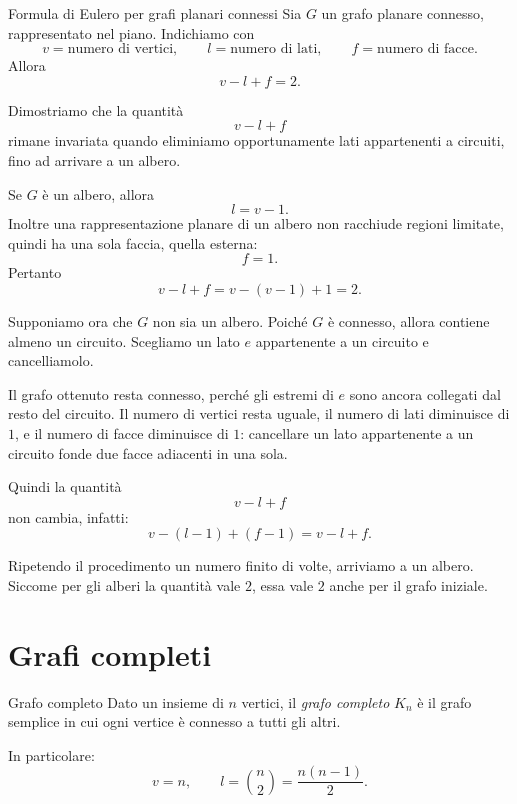 \documentclass[a4paper]{article}
\begin{document}
\begin{snippettheorem}{Formula di Eulero per grafi planari connessi}
    Sia \(G\) un grafo planare connesso, rappresentato nel piano. Indichiamo con
    \[
        v=\text{numero di vertici},
        \qquad
        l=\text{numero di lati},
        \qquad
        f=\text{numero di facce}.
    \]
    Allora
    \[
        v-l+f=2.
    \]
\end{snippettheorem}

\begin{snippetproof}{}
    Dimostriamo che la quantità
    \[
        v-l+f
    \]
    rimane invariata quando eliminiamo opportunamente lati appartenenti a circuiti, fino ad arrivare a un albero.

    Se \(G\) è un albero, allora
    \[
        l=v-1.
    \]
    Inoltre una rappresentazione planare di un albero non racchiude regioni limitate, quindi ha una sola faccia, quella esterna:
    \[
        f=1.
    \]
    Pertanto
    \[
        v-l+f
        =
        v-(v-1)+1
        =
        2.
    \]

    Supponiamo ora che \(G\) non sia un albero. Poiché \(G\) è connesso, allora contiene almeno un circuito. Scegliamo un lato \(e\) appartenente a un circuito e cancelliamolo.

    Il grafo ottenuto resta connesso, perché gli estremi di \(e\) sono ancora collegati dal resto del circuito. Il numero di vertici resta uguale, il numero di lati diminuisce di \(1\), e il numero di facce diminuisce di \(1\): cancellare un lato appartenente a un circuito fonde due facce adiacenti in una sola.

    Quindi la quantità
    \[
        v-l+f
    \]
    non cambia, infatti:
    \[
        v-(l-1)+(f-1)=v-l+f.
    \]

    Ripetendo il procedimento un numero finito di volte, arriviamo a un albero. Siccome per gli alberi la quantità vale \(2\), essa vale \(2\) anche per il grafo iniziale.
\end{snippetproof}

\section{Grafi completi}

\begin{snippetdefinition}{Grafo completo}
    Dato un insieme di \(n\) vertici, il \emph{grafo completo} \(K_n\) è il grafo semplice in cui ogni vertice è connesso a tutti gli altri.

    In particolare:
    \[
        v=n,
        \qquad
        l=\binom{n}{2}=\frac{n(n-1)}{2}.
    \]
\end{snippetdefinition}
\end{document}
